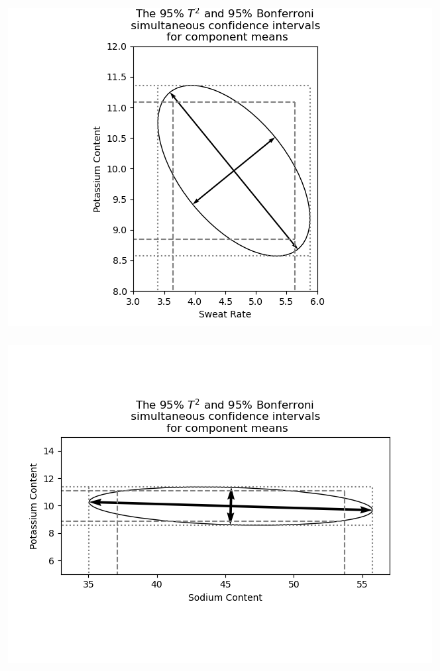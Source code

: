 \begin{figure}[H]
    \centering
    \includegraphics[scale=0.75]{./python/chapter-5/Question-5-7-CI-Sweat-Potassium.png}
\end{figure}

\begin{figure}[H]
    \centering
    \includegraphics[scale=0.75]{./python/chapter-5/Question-5-7-CI-Sodium-Potassium.png}
\end{figure}

